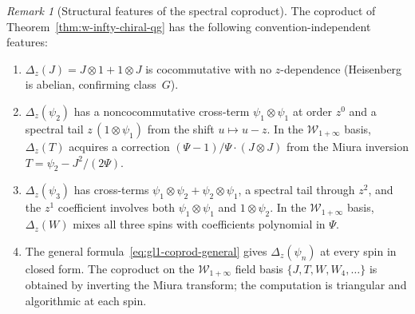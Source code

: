 \documentclass[11pt,reqno]{amsart}
\theoremstyle{definition}
\theoremstyle{remark}
\newtheorem{remark}[theorem]{Remark}
\newcommand{\cW}{\mathcal{W}}
\numberwithin{equation}{section}
\begin{document}
\begin{remark}[Structural features of the spectral coproduct]
\label{rem:w-infty-coprod-structure}
The coproduct of
Theorem~\textup{\ref{thm:w-infty-chiral-qg}}
has the following convention-independent features:
\begin{enumerate}[label=\textup{(\arabic*)}]
\item $\Delta_z(J) = J \otimes 1
  + 1 \otimes J$ is cocommutative with no
  $z$-dependence (Heisenberg is abelian,
  confirming class~$G$).
\item $\Delta_z(\psi_2)$ has a noncocommutative
  cross-term $\psi_1 \otimes \psi_1$ at order
  $z^0$ and a spectral tail
  $z\,(1 \otimes \psi_1)$ from the shift
  $u \mapsto u - z$.
  In the $\cW_{1+\infty}$ basis,
  $\Delta_z(T)$ acquires a correction
  $(\Psi - 1)/\Psi \cdot (J \otimes J)$ from the
  Miura inversion $T = \psi_2 - J^2/(2\Psi)$.
\item $\Delta_z(\psi_3)$ has cross-terms
  $\psi_1 \otimes \psi_2 + \psi_2 \otimes \psi_1$,
  a spectral tail through $z^2$, and the $z^1$
  coefficient involves both $\psi_1 \otimes \psi_1$
  and $1 \otimes \psi_2$. In the $\cW_{1+\infty}$
  basis, $\Delta_z(W)$ mixes all three spins with
  coefficients polynomial in $\Psi$.
\item The general formula~\eqref{eq:gl1-coprod-general}
  gives $\Delta_z(\psi_n)$ at every spin in closed form.
  The coproduct on the $\cW_{1+\infty}$ field basis
  $\{J, T, W, W_4, \ldots\}$ is obtained by
  inverting the Miura transform; the computation is
  triangular and algorithmic at each spin.
\end{enumerate}
\end{remark}
\end{document}
